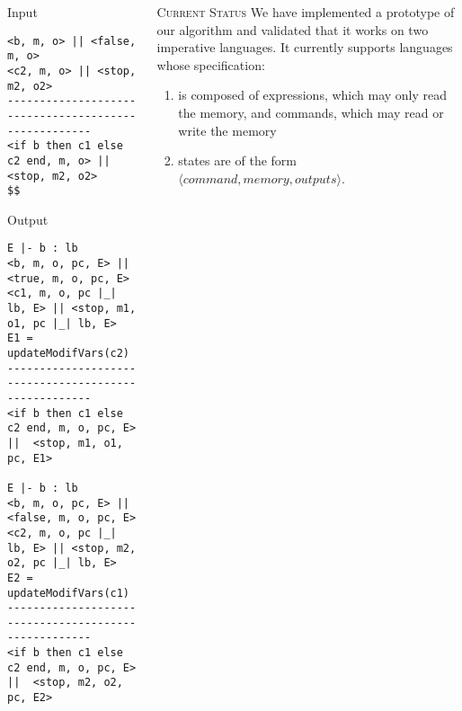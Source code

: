 \documentclass[final]{beamer}
\newlength{\onecolwid}
\newlength{\twocolwid}
\begin{document}
\begin{frame}[fragile]
\begin{columns}[t]
\begin{column}{\twocolwid}
\begin{minipage}[t]{0.48\linewidth}
\begin{alertblock}{Input}
\begin{lstlisting}
<b, m, o> || <false, m, o>
<c2, m, o> || <stop, m2, o2>
-----------------------------------------------------
<if b then c1 else c2 end, m, o> || <stop, m2, o2>
$$
\end{lstlisting}        
\end{alertblock}
\end{minipage}
\hfill%
\begin{minipage}[t]{0.48\linewidth}
\begin{alertblock}{Output}
\begin{lstlisting}
E |- b : lb
<b, m, o, pc, E> || <true, m, o, pc, E>
<c1, m, o, pc |_| lb, E> || <stop, m1, o1, pc |_| lb, E>
E1 = updateModifVars(c2)
-----------------------------------------------------
<if b then c1 else c2 end, m, o, pc, E> ||  <stop, m1, o1, pc, E1>

E |- b : lb
<b, m, o, pc, E> || <false, m, o, pc, E>
<c2, m, o, pc |_| lb, E> || <stop, m2, o2, pc |_| lb, E>
E2 = updateModifVars(c1)
-----------------------------------------------------
<if b then c1 else c2 end, m, o, pc, E> ||  <stop, m2, o2, pc, E2>
\end{lstlisting}
\end{alertblock}
\end{minipage}








\end{column}

\begin{column}{\onecolwid}

\begin{block}{\textsc{Current Status}}
We have implemented a prototype of our algorithm and validated that it works on two imperative languages. It currently supports languages whose specification: 
\begin{enumerate}
\item is composed of expressions, which may only read the memory, and commands, which may read or write the memory
\item states are of the form $\langle command, memory, outputs\rangle$. 
\end{enumerate}


\end{block}
\end{column}
\end{columns}
\end{frame}
\end{document}
